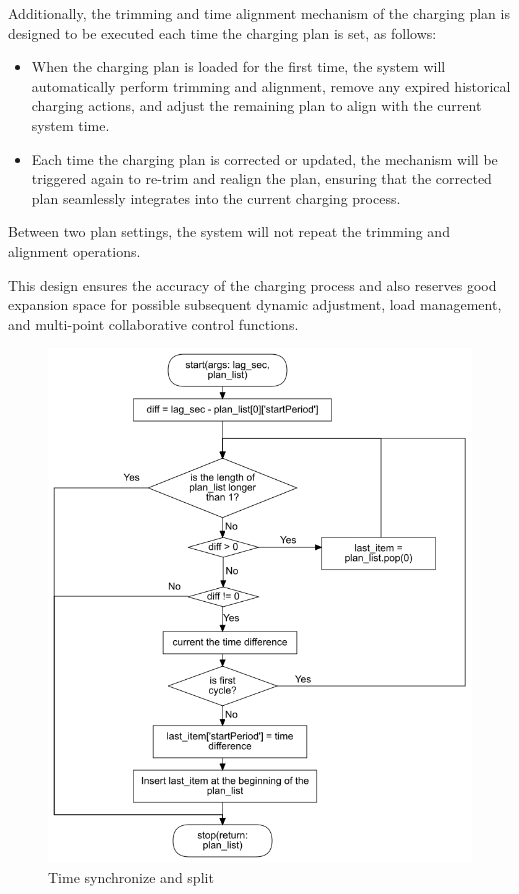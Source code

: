 \documentclass[
english,
ruledheaders=section,%
class=report,%
thesis={type=Report},%
accentcolor=9c,%
custommargins=true,%
marginpar=false,%
parskip=half-,%
fontsize=11pt,%
logofile={img/tuda_logo.pdf}, %
]{tudapub}
\begin{document}
    Additionally, the trimming and time alignment mechanism of the charging plan is designed to be executed each time the charging plan is set, as follows:

    \begin{itemize}
        \item When the charging plan is loaded for the first time, the system will automatically perform trimming and alignment, remove any expired historical charging actions, and adjust the remaining plan to align with the current system time.
        \item Each time the charging plan is corrected or updated, the mechanism will be triggered again to re-trim and realign the plan, ensuring that the corrected plan seamlessly integrates into the current charging process.
    \end{itemize}

    Between two plan settings, the system will not repeat the trimming and alignment operations.

    This design ensures the accuracy of the charging process and also reserves good expansion space for possible subsequent dynamic adjustment, load management, and multi-point collaborative control functions.
    \begin{figure}[H]
        \centering
        \includegraphics[width=0.7\linewidth]{img/PlanCutting.png}
        \caption{Time synchronize and split}
        \label{fig:planCutting}
    \end{figure}
\end{document}

